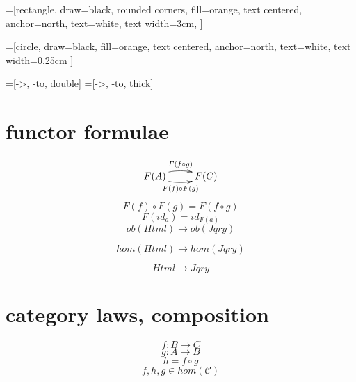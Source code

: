 \documentclass[11hpt]{article}
\begin{document}
=[rectangle, draw=black, rounded corners, fill=orange,
        text centered, anchor=north, text=white, text width=3cm, ]

=[circle, draw=black, fill=orange,
        text centered, anchor=north, text=white, text width=0.25cm ]

=[->, -to, double]
=[->, -to, thick]

\section{functor formulae}

\begin{equation} \label{eq:functor-arrows}
  \xymatrix{ F(A) \ar@/^/[r]^{F(f \circ g)} \ar@/_/[r]_{F(f) \circ F(g)} & F(C) }
\end{equation}
\begin{equation} \label{eq:functor-equate}
  F(f) \circ F(g) = F(f \circ g)
\end{equation}
\begin{equation} \label{eq:functor-id}
  F(id_{a}) = id_{F(a)}
\end{equation}
\begin{equation} \label{eq:functor-html-jqry}
ob(Html) \to ob(Jqry)
\end{equation}

\begin{equation} \label{eq:functor-html-jqry}
hom(Html) \to hom(Jqry)
\end{equation}

\begin{equation} \label{eq:functor-html-jqry}
Html \to Jqry
\end{equation}

\section{category laws, composition}
\begin{equation}
f: B \to C
\end{equation}
\begin{equation}
g: A \to B
\end{equation}
\begin{equation}
h = f \circ g
\end{equation}
\begin{equation}
f,h,g \in hom(\mathcal{C})
\end{equation}
\end{document}
